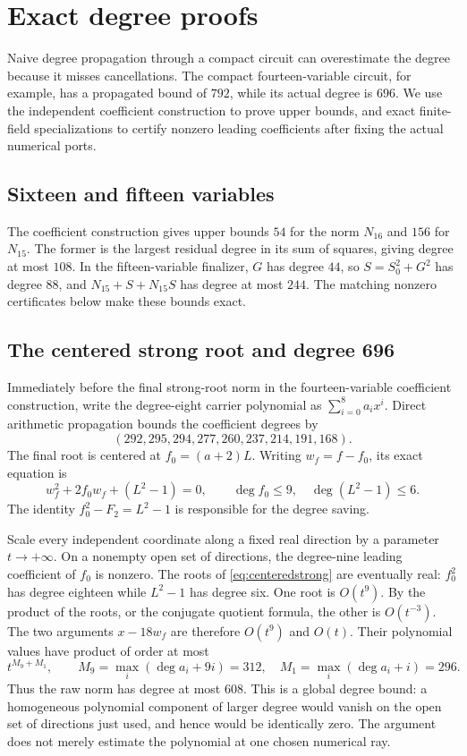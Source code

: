 \documentclass[11pt]{article}
\theoremstyle{definition}
\theoremstyle{remark}
\begin{document}
\section{Exact degree proofs}
\label{sec:degrees}

Naive degree propagation through a compact circuit can overestimate the
degree because it misses cancellations. The compact fourteen-variable
circuit, for example, has a propagated bound of \(792\), while its actual
degree is \(696\). We use the independent coefficient construction to
prove upper bounds, and exact finite-field specializations to certify
nonzero leading coefficients after fixing the actual numerical ports.

\subsection{Sixteen and fifteen variables}

The coefficient construction gives upper bounds \(54\) for the norm
\(N_{16}\) and \(156\) for \(N_{15}\). The former is the largest residual
degree in its sum of squares, giving degree at most \(108\). In the
fifteen-variable finalizer, \(G\) has degree \(44\), so
\(S=S_0^2+G^2\) has degree \(88\), and \(N_{15}+S+N_{15}S\) has degree at
most \(244\). The matching nonzero certificates below make these bounds
exact.

\subsection{The centered strong root and degree 696}

Immediately before the final strong-root norm in the fourteen-variable
coefficient construction, write the degree-eight carrier polynomial as
\(\sum_{i=0}^8a_i x^i\). Direct arithmetic propagation bounds the
coefficient degrees by
\[
 (292,295,294,277,260,237,214,191,168).
 \label{eq:coefficient8}
\]
The final root is centered at \(f_0=(a+2)L\). Writing \(w_f=f-f_0\),
its exact equation is
\begin{equation}
 w_f^2+2f_0w_f+(L^2-1)=0,
 \qquad \deg f_0\le9,\quad \deg(L^2-1)\le6.
 \label{eq:centeredstrong}
\end{equation}
The identity \(f_0^2-F_2=L^2-1\) is responsible for the degree saving.

Scale every independent coordinate along a fixed real direction by a
parameter \(t\to+\infty\). On a nonempty open set of directions, the
degree-nine leading coefficient of \(f_0\) is nonzero. The roots of
\eqref{eq:centeredstrong} are eventually real: \(f_0^2\) has degree
eighteen while \(L^2-1\) has degree six. One root is \(O(t^9)\). By the
product of the roots, or the conjugate quotient formula, the other is
\(O(t^{-3})\). The two arguments \(x-18w_f\) are therefore
\(O(t^9)\) and \(O(t)\). Their polynomial values have product of order
at most
\[
 t^{M_9+M_1},\qquad
 M_9=\max_i(\deg a_i+9i)=312,\quad
 M_1=\max_i(\deg a_i+i)=296.
\]
Thus the raw norm has degree at most \(608\). This is a global degree
bound: a homogeneous polynomial component of larger degree would vanish
on the open set of directions just used, and hence would be identically
zero. The argument does not merely estimate the polynomial at one
chosen numerical ray.
\end{document}
